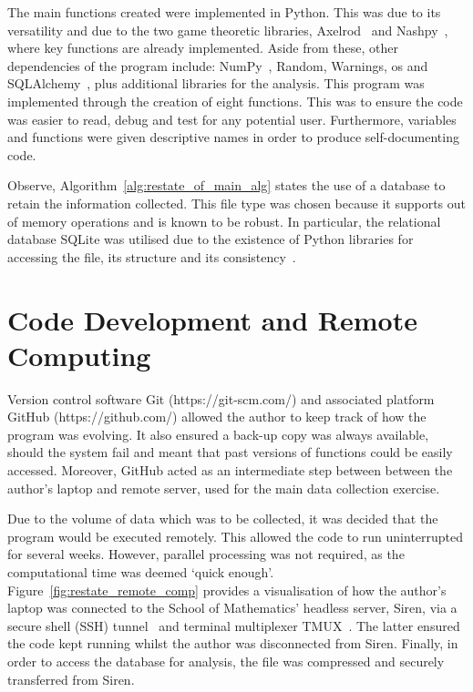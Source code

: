 The main functions created were implemented in Python. This was due to its
versatility and due to the two game theoretic libraries, Axelrod~\cite{axelrodproject}
and Nashpy~\cite{Nashpy2019}, where key functions are already implemented. Aside from these,
other dependencies of the program include: NumPy~\cite{Walt2011}, Random, Warnings, os and
SQLAlchemy~\cite{sqlalchemy}, plus additional libraries for the analysis. This
program was implemented through the creation of eight functions. This was to ensure the
code was easier to read, debug and test for any potential user.
Furthermore, variables and functions were given descriptive names in order to
produce self-documenting code.

\newpage
Observe, Algorithm~\ref{alg:restate_of_main_alg} states the use of a database to
retain the information collected. This file type was chosen because it supports
out of memory operations and is known to be robust. In particular, the
relational database SQLite was utilised due to the existence of Python libraries
for accessing the file, its structure and its consistency~\cite{Codd2002,ostezer2019}.

\section{Code Development and Remote Computing}
Version control software Git (https://git-scm.com/) and associated platform
GitHub (https://github.com/) allowed the author
to keep track of how the program was evolving. It also ensured a back-up copy
was always available, should the system fail and meant that past versions of
functions could be easily accessed. Moreover, GitHub acted as an intermediate
step between between the author's laptop and remote server, used for the main
data collection exercise. 

Due to the volume of data which was to be collected, it was decided that the
program would be executed remotely. This allowed the code to run uninterrupted
for several weeks. However, parallel processing was not required, as the
computational time was deemed `quick enough'.
Figure~\ref{fig:restate_remote_comp} provides a visualisation of how the
author's laptop was connected to the School of Mathematics' headless server,
Siren, via a secure shell (SSH) tunnel~\cite{SSH.COM2016} and terminal multiplexer TMUX~\cite{Marriott}. The latter
ensured the code kept running whilst the author was disconnected from Siren.
Finally, in order to access the database for analysis, the file was compressed
and securely transferred from Siren.

